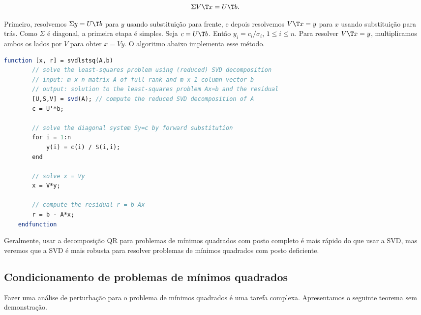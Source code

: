 \documentclass{article}
\begin{document}
\begin{equation}
    \Sigma V\T  x = U\T  b.
\end{equation}

Primeiro, resolvemos \(\Sigma y = U\T  b\) para \(y\) usando substituição para frente, e depois resolvemos \(V\T  x = y\) para \(x\) usando substituição para trás. Como \(\Sigma\) é diagonal, a primeira etapa é simples. Seja \(c = U\T  b\). Então \(y_i = c_i / \sigma_i\), \(1 \leq i \leq n\). Para resolver \(V\T  x = y\), multiplicamos ambos os lados por \(V\) para obter \(x = V y\). O algoritmo abaixo implementa esse método.

\begin{lstlisting}[language=Scilab, caption=Resolvendo o problema de mínimos quadrados usando a decomposição SVD]
    function [x, r] = svdlstsq(A,b)
        // solve the least-squares problem using (reduced) SVD decomposition
        // input: m x n matrix A of full rank and m x 1 column vector b
        // output: solution to the least-squares problem Ax=b and the residual
        [U,S,V] = svd(A); // compute the reduced SVD decomposition of A
        c = U'*b;
        
        // solve the diagonal system Sy=c by forward substitution
        for i = 1:n
            y(i) = c(i) / S(i,i);
        end
        
        // solve x = Vy
        x = V*y;
        
        // compute the residual r = b-Ax
        r = b - A*x;
    endfunction
\end{lstlisting}

Geralmente, usar a decomposição QR para problemas de mínimos quadrados com posto completo é mais rápido do que usar a SVD, mas veremos que a SVD é mais robusta para resolver problemas de mínimos quadrados com posto deficiente.

\subsection{Condicionamento de problemas de mínimos quadrados}

Fazer uma análise de perturbação para o problema de mínimos quadrados é uma tarefa complexa. Apresentamos o seguinte teorema sem demonstração.
\end{document}
